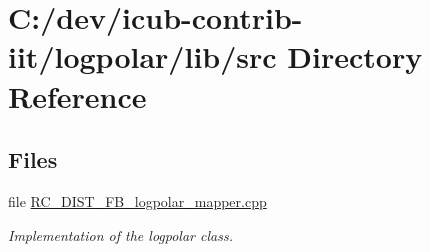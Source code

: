 \section{C\+:/dev/icub-\/contrib-\/iit/logpolar/lib/src Directory Reference}
\label{dir_a065c5f60305fee3569f887679366939}
\subsection*{Files}
\begin{DoxyCompactItemize}
\item 
file \hyperlink{RC__DIST__FB__logpolar__mapper_8cpp}{R\+C\+\_\+\+D\+I\+S\+T\+\_\+\+F\+B\+\_\+logpolar\+\_\+mapper.\+cpp}
\begin{DoxyCompactList}\small\item\em Implementation of the logpolar class. \end{DoxyCompactList}\end{DoxyCompactItemize}
